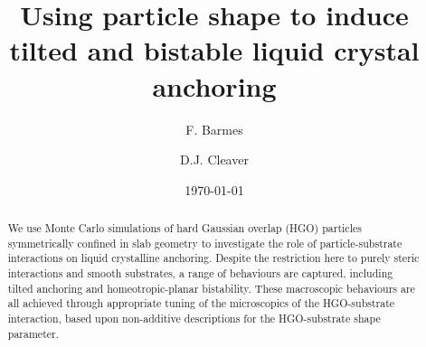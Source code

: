 \documentclass[aps,10pt,twocolumn]{revtex4}
\begin{document}
\graphicspath
{
{../imgs/}
}


\title{Using particle shape to induce tilted and bistable liquid crystal anchoring}

\author{F. Barmes}

\author{D.J. Cleaver}






\date{\today}



\begin{abstract}
We use Monte Carlo simulations of hard Gaussian overlap (HGO) particles symmetrically confined
in slab geometry to investigate the role of particle-substrate interactions on liquid
crystalline anchoring. Despite the restriction here to purely steric interactions and smooth
substrates, a range of behaviours are captured, including tilted anchoring and
homeotropic-planar bistability. These macroscopic behaviours are all achieved through
appropriate tuning of the microscopics of the HGO-substrate interaction, based upon non-additive
descriptions for the HGO-substrate shape parameter.
\end{abstract}
\end{document}
